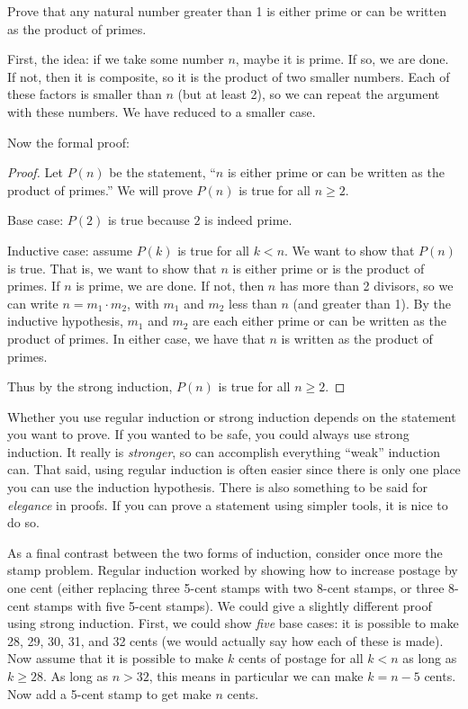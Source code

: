 \documentclass[12pt]{article}
\begin{document}
\begin{example}
	Prove that any natural number greater than 1 is either prime or can be written as the product of primes.
	\begin{solution}
		First, the idea: if we take some number $n$, maybe it is prime.  If so, we are done.  If not, then it is composite, so it is the product of two smaller numbers.  Each of these factors is smaller than $n$ (but at least 2), so we can repeat the argument with these numbers.  We have reduced to a smaller case.
		
		Now the formal proof:
		\begin{proof}
			Let $P(n)$ be the statement, ``$n$ is either prime or can be written as the product of primes.''  We will prove $P(n)$ is true for all $n \ge 2$. 
			
			Base case: $P(2)$ is true because $2$ is indeed prime.
			
			Inductive case: assume $P(k)$ is true for all $k < n$.  We want to show that $P(n)$ is true.  That is, we want to show that $n$ is either prime or is the product of primes.  If $n$ is prime, we are done.  If not, then $n$ has more than 2 divisors, so we can write $n = m_1 \cdot m_2$, with $m_1$ and $m_2$ less than $n$ (and greater than 1).  By the inductive hypothesis, $m_1$ and $m_2$ are each either prime or can be written as the product of primes.  In either case, we have that $n$ is written as the product of primes.
			
			Thus by the strong induction, $P(n)$ is true for all $n \ge 2$. 		
		\end{proof} 
	\end{solution}
\end{example}

Whether you use regular induction or strong induction depends on the statement you want to prove.  If you wanted to be safe, you could always use strong induction.  It really is \emph{stronger}, so can accomplish everything ``weak'' induction can.  That said, using regular induction is often easier since there is only one place you can use the induction hypothesis.  There is also something to be said for \emph{elegance} in proofs.  If you can prove a statement using simpler tools, it is nice to do so.

As a final contrast between the two forms of induction, consider once more the stamp problem.  Regular induction worked by showing how to increase postage by one cent (either replacing three 5-cent stamps with two 8-cent stamps, or three 8-cent stamps with five 5-cent stamps).  We could give a slightly different proof using strong induction.  First, we could show \emph{five} base cases: it is possible to make 28, 29, 30, 31, and 32 cents (we would actually say how each of these is made).  Now assume that it is possible to make $k$ cents of postage for all $k < n$ as long as $k \ge 28$.  As long as $n > 32$, this means in particular we can make $k = n-5$ cents.  Now add a 5-cent stamp to get make $n$ cents.
\end{document}
